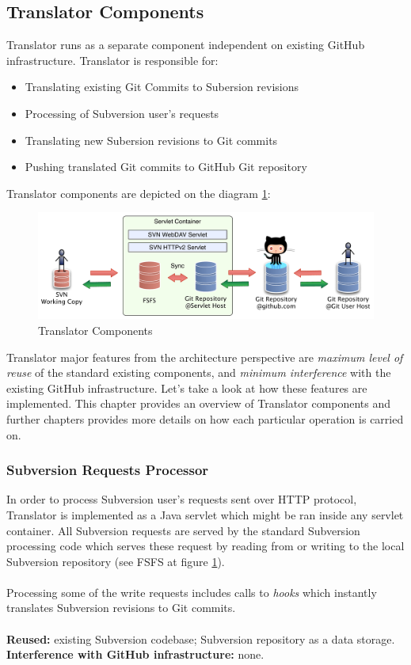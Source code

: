 \subsection{Translator Components}

Translator runs as a separate component independent on existing GitHub infrastructure. Translator is responsible for:
\begin{itemize}
  \item Translating existing Git Commits to Subersion revisions
  \item Processing of Subversion user's requests
  \item Translating new Subersion revisions to Git commits
  \item Pushing translated Git commits to GitHub Git repository
\end{itemize}
Translator components are depicted on the diagram \ref{translator_components_pic}:
\begin{figure}[!h]
\label{translator_components_pic}
\centering
\includegraphics[width=\linewidth]{img/servlet/components_keep_github_safe.pdf}
\caption{Translator Components}
\end{figure}

Translator major features from the architecture perspective are \emph{maximum level of reuse} of the standard existing components, and \emph{minimum interference} with the existing GitHub infrastructure. 
Let's take a look at how these features are implemented. This chapter provides an overview of Translator components and further chapters provides more details on how each particular operation is carried on.

\label{srp}
\subsubsection{Subversion Requests Processor}
In order to process Subversion user's requests sent over HTTP protocol, Translator is implemented as a Java servlet which might be ran inside any servlet container. All Subversion requests are served by the standard Subversion processing code which serves 
these request by reading from or writing to the local Subversion repository (see FSFS at figure \ref{translator_components_pic}).
\\\\
Processing some of the write requests includes calls to \emph{hooks} which instantly translates Subversion revisions to Git commits.
\\\\
\textbf{Reused:} existing Subversion codebase; Subversion repository as a data storage.\\
\textbf{Interference with GitHub infrastructure:} none. 

